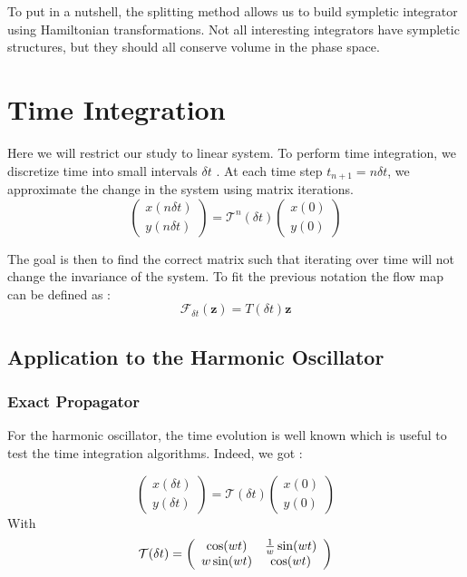 \documentclass[ansiapaper]{report}
\begin{document}
\begin{multicols}{3}
  To put in a nutshell, the splitting method allows us to build sympletic integrator using Hamiltonian transformations. Not all interesting integrators have sympletic structures, but they should all conserve volume in the phase space.




  \section{Time Integration}

  Here we will restrict our study to linear system. To perform time integration, we discretize time into small intervals $\delta t$ . At each time step $t_{n+1}=n \delta t$, we approximate the change in the system using matrix iterations.
  $$ \begin{pmatrix}
      x(n\delta t) \\
      y(n\delta t)
    \end{pmatrix} = \mathcal{T}^n(\delta t) \begin{pmatrix}
      x(0) \\
      y(0)
    \end{pmatrix}$$

  The goal is then to find the correct matrix such that iterating over time will not change the invariance of the system. To fit the previous notation the flow map can be defined as :
  $$\mathcal{F}_{\delta t}(\textbf{z} ) = T(\delta t)\textbf{z} $$

  \subsection{Application to the Harmonic Oscillator}

  \subsubsection{Exact Propagator}

  For the harmonic oscillator, the time evolution is well known which is useful to test the time integration algorithms. Indeed, we got :

  $$ \begin{pmatrix}
      x(\delta t) \\
      y(\delta  t)
    \end{pmatrix} = \mathcal{T}(\delta t) \begin{pmatrix}
      x(0) \\
      y(0)
    \end{pmatrix}$$
  With $$\mathcal{T}(\delta t) =  \left(\begin{array}{cc}
        \cos(wt)    & \frac{1}{w}\sin(wt) \\
        \-w\sin(wt) & \cos(wt)
      \end{array}\right)$$


\end{multicols}
\end{document}
